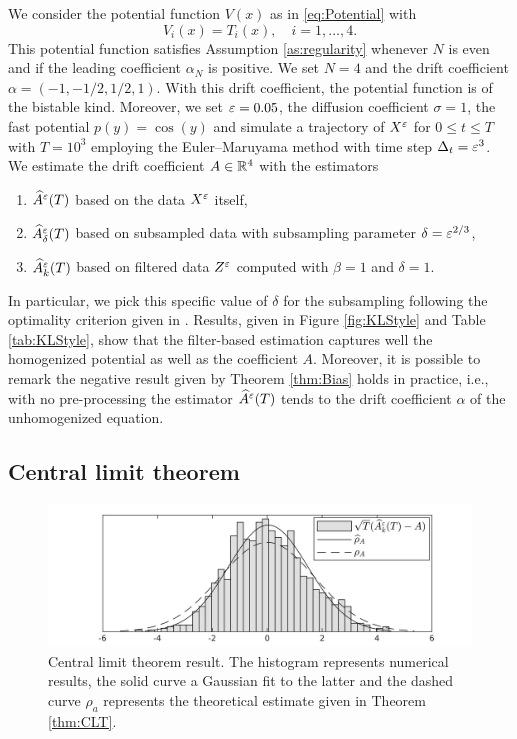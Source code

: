 \documentclass[10pt]{article}
\begin{document}
We consider the potential function $V(x)$ as in \eqref{eq:Potential} with
\begin{equation}
V_i(x) = T_i(x), \quad i =1, \ldots, 4.
\end{equation}
This potential function satisfies Assumption \ref{as:regularity} whenever $N$ is even and if the leading coefficient $\alpha_N$ is positive. We set $N = 4$ and the drift coefficient $\alpha = (-1, -1/2, 1/2, 1)$. With this drift coefficient, the potential function is of the bistable kind. Moreover, we set $\varepsilon = 0.05$, the diffusion coefficient $\sigma = 1$, the fast potential $p(y) = \cos(y)$ and simulate a trajectory of $X^\varepsilon$ for $0 \leq t \leq T$ with $T = 10^3$ employing the Euler--Maruyama method with time step $\Delta_t = \varepsilon^3$. We estimate the drift coefficient $A \in \mathbb{R}^4$ with the estimators
\begin{enumerate}
	\item $\widehat A^\varepsilon(T)$ based on the data $X^\varepsilon$ itself,
	\item $\widehat A^\varepsilon_\delta(T)$ based on subsampled data with subsampling parameter $\delta = \varepsilon^{2/3}$,
	\item $\widehat A^\varepsilon_k(T)$ based on filtered data $Z^\varepsilon$ computed with $\beta = 1$ and $\delta = 1$.
\end{enumerate}
In particular, we pick this specific value of $\delta$ for the subsampling following the optimality criterion given in \cite{PaS07}. Results, given in Figure \ref{fig:KLStyle} and Table \ref{tab:KLStyle}, show that the filter-based estimation captures well the homogenized potential as well as the coefficient $A$. Moreover, it is possible to remark the negative result given by Theorem \ref{thm:Bias} holds in practice, i.e., with no pre-processing the estimator $\widehat A^\varepsilon(T)$ tends to the drift coefficient $\alpha$ of the unhomogenized equation.

\subsection{Central limit theorem}
\begin{figure}[t]
	\centering
	\includegraphics[]{Figures/CLT}
	\caption{Central limit theorem result. The histogram represents numerical results, the solid curve a Gaussian fit to the latter and the dashed curve $\rho_a$ represents the theoretical estimate given in Theorem \ref{thm:CLT}.}
	\label{fig:CLT}
\end{figure}
\end{document}
